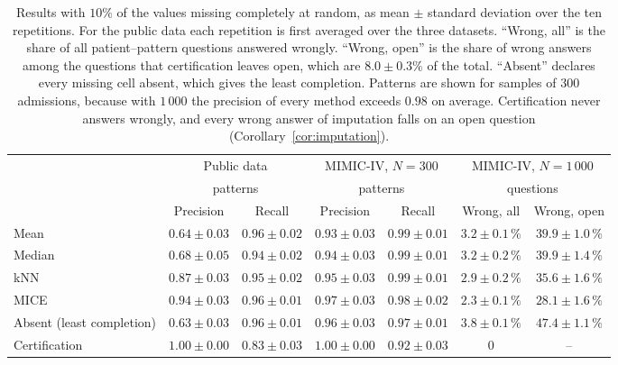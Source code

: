 \begin{table}[t]
\centering
\footnotesize
\setlength{\tabcolsep}{2.4pt}
\begin{tabular}{lcccccc}
\toprule
 & \multicolumn{2}{c}{Public data} & \multicolumn{2}{c}{MIMIC-IV, $N=300$} & \multicolumn{2}{c}{MIMIC-IV, $N=1\,000$}\\
 & \multicolumn{2}{c}{patterns} & \multicolumn{2}{c}{patterns} & \multicolumn{2}{c}{questions}\\
\cmidrule(lr){2-3}\cmidrule(lr){4-5}\cmidrule(lr){6-7}
 & Precision & Recall & Precision & Recall & Wrong, all & Wrong, open\\
\midrule
Mean & $0.64\pm0.03$ & $0.96\pm0.02$ & $0.93\pm0.03$ & $0.99\pm0.01$ & $3.2\pm0.1\,\%$ & $39.9\pm1.0\,\%$\\
Median & $0.68\pm0.05$ & $0.94\pm0.02$ & $0.94\pm0.03$ & $0.99\pm0.01$ & $3.2\pm0.2\,\%$ & $39.9\pm1.4\,\%$\\
kNN & $0.87\pm0.03$ & $0.95\pm0.02$ & $0.95\pm0.03$ & $0.99\pm0.01$ & $2.9\pm0.2\,\%$ & $35.6\pm1.6\,\%$\\
MICE & $0.94\pm0.03$ & $0.96\pm0.01$ & $0.97\pm0.03$ & $0.98\pm0.02$ & $2.3\pm0.1\,\%$ & $28.1\pm1.6\,\%$\\
\addlinespace[2pt]
Absent (least completion) & $0.63\pm0.03$ & $0.96\pm0.01$ & $0.96\pm0.03$ & $0.97\pm0.01$ & $3.8\pm0.1\,\%$ & $47.4\pm1.1\,\%$\\
Certification & $1.00\pm0.00$ & $0.83\pm0.03$ & $1.00\pm0.00$ & $0.92\pm0.03$ & $0$ & --\\
\bottomrule
\end{tabular}
\caption{Results with $10\%$ of the values missing completely at random, as mean $\pm$ standard deviation over the ten repetitions. For the public data each repetition is first averaged over the three datasets. ``Wrong, all'' is the share of all patient--pattern questions answered wrongly. ``Wrong, open'' is the share of wrong answers among the questions that certification leaves open, which are $8.0\pm0.3\%$ of the total. ``Absent'' declares every missing cell absent, which gives the least completion. Patterns are shown for samples of $300$ admissions, because with $1\,000$ the precision of every method exceeds $0.98$ on average. Certification never answers wrongly, and every wrong answer of imputation falls on an open question (Corollary~\ref{cor:imputation}).}
\label{tab:results}
\end{table}
